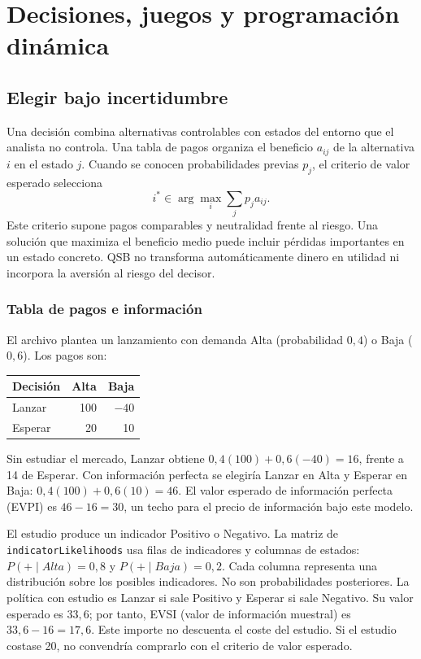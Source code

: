 \chapter{Decisiones, juegos y programación dinámica}
\label{chap:decisiones}

\section{Elegir bajo incertidumbre}
Una decisión combina alternativas controlables con estados del entorno que el
analista no controla. Una tabla de pagos organiza el beneficio $a_{ij}$ de la
alternativa $i$ en el estado $j$. Cuando se conocen probabilidades previas $p_j$,
el criterio de valor esperado selecciona
\[
 i^*\in\arg\max_i\sum_j p_j a_{ij}.
\]
Este criterio supone pagos comparables y neutralidad frente al riesgo. Una
solución que maximiza el beneficio medio puede incluir pérdidas importantes en
un estado concreto. QSB no transforma automáticamente dinero en utilidad ni
incorpora la aversión al riesgo del decisor.

\subsection{Tabla de pagos e información}
El archivo  plantea un lanzamiento con demanda Alta
(probabilidad $0{,}4$) o Baja ($0{,}6$). Los pagos son:
\begin{center}
\begin{tabular}{lrr}
\toprule
Decisión & Alta & Baja\\
\midrule
Lanzar & 100 & $-40$\\
Esperar & 20 & 10\\
\bottomrule
\end{tabular}
\end{center}
Sin estudiar el mercado, Lanzar obtiene $0{,}4(100)+0{,}6(-40)=16$, frente a
14 de Esperar. Con información perfecta se elegiría Lanzar en Alta y Esperar
en Baja: $0{,}4(100)+0{,}6(10)=46$. El valor esperado de información perfecta
(EVPI) es $46-16=30$, un techo para el precio de información bajo este modelo.

El estudio produce un indicador Positivo o Negativo. La matriz de
\texttt{indicatorLikelihoods} usa filas de indicadores y columnas de estados:
$P(+\mid Alta)=0{,}8$ y $P(+\mid Baja)=0{,}2$. Cada columna representa una
distribución sobre los posibles indicadores. No son probabilidades posteriores.
La política con estudio es Lanzar si sale Positivo y Esperar si sale Negativo.
Su valor esperado es $33{,}6$; por tanto, EVSI (valor de información muestral)
es $33{,}6-16=17{,}6$. Este importe no descuenta el coste del estudio. Si el
estudio costase 20, no convendría comprarlo con el criterio de valor esperado.

